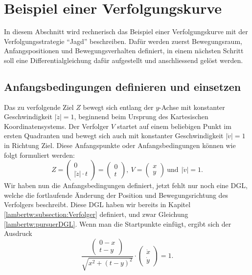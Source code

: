 %
%
%
\section{Beispiel einer Verfolgungskurve
\label{lambertw:section:teil4}}
In diesem Abschnitt wird rechnerisch das Beispiel einer Verfolgungskurve mit der Verfolgungsstrategie ``Jagd'' beschreiben. Dafür werden zuerst Bewegungsraum, Anfangspositionen und Bewegungsverhalten definiert, in einem nächsten Schritt soll eine Differentialgleichung dafür aufgestellt und anschliessend gelöst werden.

\subsection{Anfangsbedingungen definieren und einsetzen
	\label{lambertw:subsection:Anfangsbedingungen}}
Das zu verfolgende Ziel \(Z\) bewegt sich entlang der \(y\)-Achse mit konstanter Geschwindigkeit \(|\dot{z}| = 1\), beginnend beim Ursprung des Kartesischen Koordinatensystems. Der Verfolger \(V\) startet auf einem beliebigen Punkt im ersten Quadranten und bewegt sich auch mit konstanter Geschwindigkeit \(|\dot{v}| = 1\) in Richtung Ziel. Diese Anfangspunkte oder Anfangsbedingungen können wie folgt formuliert werden:
\begin{equation}
	Z
	=
	\left( \begin{array}{c} 0 \\ |\dot{z}| \cdot t \end{array} \right)
	=
	\left( \begin{array}{c} 0 \\ t \end{array} \right)
	,\:
	V
	=
	\left( \begin{array}{c} x \\ y \end{array} \right)
	\:\text{und}\:\:
	|\dot{v}|
	=
	1.
	\label{lambertw:Anfangsbed}
\end{equation}
Wir haben nun die Anfangsbedingungen definiert, jetzt fehlt nur noch eine DGL, welche die fortlaufende Änderung der Position und Bewegungsrichtung des Verfolgers beschreibt. 
Diese DGL haben wir bereits in Kapitel \ref{lambertw:subsection:Verfolger} definiert, und zwar Gleichung \eqref{lambertw:pursuerDGL}. Wenn man die Startpunkte einfügt, ergibt sich der Ausdruck
\begin{equation}
	\frac{\left( \begin{array}{c} 0-x \\ t-y \end{array} \right)}{\sqrt{x^2 + (t-y)^2}}
	\cdot
	\left(\begin{array}{c} \dot{x} \\ \dot{y} \end{array}\right)
	=
	1.
	\label{lambertw:eqMitAnfangsbed}
\end{equation}

